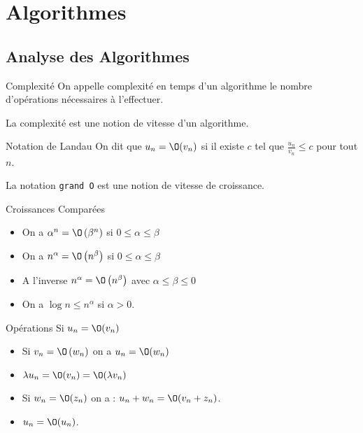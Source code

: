 \documentclass{cours}
\begin{document}
\section{Algorithmes}
\subsection{Analyse des Algorithmes}
\begin{définition}{Complexité}{}
On appelle complexité en temps d'un algorithme le nombre d'opérations nécessaires à l'effectuer.
\end{définition}
La complexité est une notion de vitesse d'un algorithme.

\begin{définition}{Notation de Landau}{}
On dit que $u_{n} = \O(v_{n})$ si il existe $c$ tel que $\frac{u_{n}}{v_{n}} \leq c$ pour tout $n$.
\end{définition}
\vspace{-5pt}
La notation \texttt{grand O} est une notion de vitesse de croissance.

\begin{propositionfr}{Croissances Comparées}{}
    \begin{itemize}
        \item On a $\alpha^{n} = \O\left(\beta^{n}\right)$ si $0 \leq \alpha \leq \beta$
        \item On a $n^{\alpha} = \O\left(n^{\beta}\right)$ si $0 \leq \alpha \leq \beta$
        \item A l'inverse $n^{\alpha} = \O\left(n^{\beta}\right)$ avec $\alpha \leq \beta\leq 0$
        \item On a $\log n \leq n^{\alpha}$ si $\alpha > 0$.
    \end{itemize}
\end{propositionfr}

\begin{propositionfr}{Opérations}{}
    Si $u_{n} = \O(v_{n})$
    \begin{itemize}
        \item Si $v_{n} = \O\left(w_{n}\right)$ on a $u_{n} = \O(w_{n})$
        \item $\lambda u_{n} = \O(v_{n}) = \O(\lambda v_{n})$
        \item Si $w_{n} = \O(z_{n})$ on a : $u_{n} + w_{n} = \O(v_{n} + z_{n})$.
        \item $u_{n} = \O(u_{n})$.
    \end{itemize}
\end{propositionfr}
\end{document}
